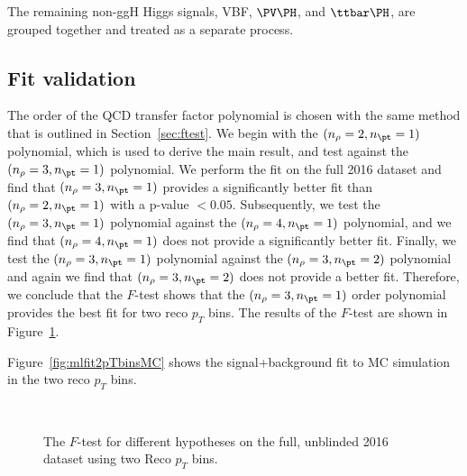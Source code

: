 The remaining non-ggH Higgs signals, VBF, $\PV\PH$, and $\ttbar\PH$, are grouped together and treated as a separate process.


\subsection{Fit validation}
The order of the QCD transfer factor polynomial is chosen with the same method that is outlined in Section~\ref{sec:ftest}. We begin with the $(n_{\rho} = 2, n_{\pt} = 1)$ polynomial, which is used to derive the main result, and test against the $(n_{\rho} = 3, n_{\pt} = 1)$ polynomial. We perform the fit on the full 2016 dataset and find that $(n_{\rho} = 3, n_{\pt} = 1)$ provides a significantly better fit than $(n_{\rho} = 2, n_{\pt} = 1)$ with a p-value $<0.05$. Subsequently, we test the $(n_{\rho} = 3, n_{\pt} = 1)$ polynomial against the $(n_{\rho} = 4, n_{\pt} = 1)$ polynomial, and we find that $(n_{\rho} = 4, n_{\pt} = 1)$ does not provide a significantly better fit. Finally, we test the $(n_{\rho} = 3, n_{\pt} = 1)$ polynomial against the $(n_{\rho} = 3, n_{\pt} = 2)$ polynomial and again we find that $(n_{\rho} = 3, n_{\pt} = 2)$ does not provide a better fit. Therefore, we conclude that the $F$-test shows that the $(n_{\rho}= 3, n_{\pt} = 1)$ order polynomial provides the best fit for two reco $p_{T}$ bins. The results of the $F$-test are shown in Figure~\ref{fig:FtestData2pTbins}.


Figure~\ref{fig:mlfit2pTbinsMC} shows the signal+background fit to MC simulation in the two reco $p_{T}$ bins.

\begin{figure}[hbtp]
\centering
{}
 \\
 \caption{The $F$-test for different hypotheses on the full, unblinded 2016 dataset using two Reco $p_{T}$ bins.}
 \label{fig:FtestData2pTbins}
 \end{figure}

